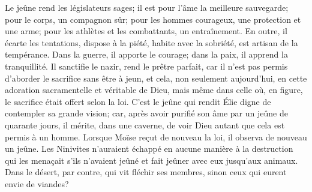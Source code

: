 Le jeûne rend les législateurs sages;
	il est pour l’âme la meilleure sauvegarde;
	pour le corps, un compagnon sûr;
	pour les hommes courageux, une protection et une arme;
	pour les athlètes et les combattants, un entraînement.
En outre, il écarte les tentations, dispose à la piété,
	habite avec la sobriété, est artisan de la tempérance.
Dans la guerre, il apporte le courage;
	dans la paix, il apprend la tranquillité.
Il sanctifie le nazir, rend le prêtre parfait,
	car il n’est pas permis d’aborder le sacrifice sans être à jeun,
	et cela, non seulement aujourd’hui,
	en cette adoration sacramentelle et véritable de Dieu,
	mais même dans celle où, en figure, le sacrifice était offert selon la loi.
C’est le jeûne qui rendit Élie digne de contempler sa grande vision;
	car, après avoir purifié son âme par un jeûne de quarante jours,
	il mérite, dans une caverne, de voir Dieu
		autant que cela est permis à un homme.
Lorsque Moïse reçut de nouveau la loi, il observa de nouveau un jeûne.
Les Ninivites n’auraient échappé en aucune manière
		à la destruction qui les menaçait
	s’ils n’avaient jeûné et fait jeûner avec eux jusqu’aux animaux.
Dans le désert, par contre, qui vit fléchir ses membres,
	sinon ceux qui eurent envie de viandes?
